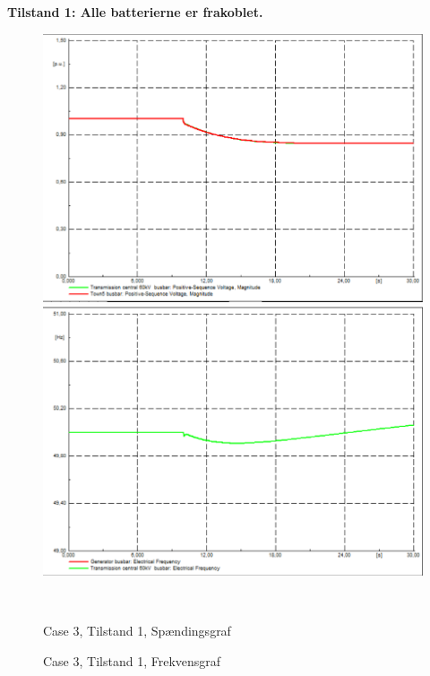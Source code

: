 \textbf{Tilstand 1: Alle batterierne er frakoblet.}
\begin{figure}[H]
	\centering
	\begin{minipage}[b]{0.48\textwidth}
		\centering
		\includegraphics[width=1.00\textwidth]{figurer/LargeDisturbance/Voltage1} %
	\end{minipage}
	\hfill
	\begin{minipage}[b]{0.48\textwidth}
		\centering
		\includegraphics[width=1.00\textwidth]{figurer/LargeDisturbance/Freq1} %
	\end{minipage}
	\\ %
	\begin{minipage}[t]{0.48\textwidth}
		\caption{Case 3, Tilstand 1, Spændingsgraf} %
		\label{fig:C3T1V}
	\end{minipage}
	\hfill
	\begin{minipage}[t]{0.48\textwidth}
		\caption{Case 3, Tilstand 1, Frekvensgraf} %
		\label{fig:C3T1F}
	\end{minipage}
\end{figure}


